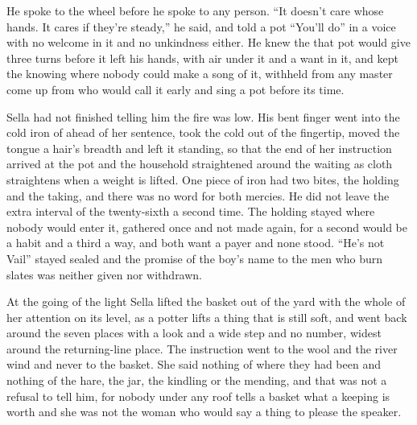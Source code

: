 He spoke to the wheel before he spoke to any person. “It doesn't care whose hands. It cares if they're steady,” he said, and told a pot “You'll do” in a voice with no welcome in it and no unkindness either. He knew the  that pot would give three turns before it left his hands, with air under it and a want in it, and kept the knowing where nobody could make a song of it, withheld from any master come up from  who would call it early and sing a pot before its time.

Sella had not finished telling him the fire was low. His bent finger went into the cold iron of  ahead of her sentence, took the cold out of the fingertip, moved the tongue a hair's breadth and left it standing, so that the end of her instruction arrived at the pot and the household straightened around the waiting as cloth straightens when a weight is lifted. One piece of iron had two bites, the holding and the taking, and there was no  word for both mercies. He did not leave the extra interval of the twenty-sixth a second time. The holding stayed where nobody would enter it, gathered once and not made again, for a second would be a habit and a third a way, and both want a payer and none stood. “He's not Vail” stayed sealed and the promise of the boy's name to the men who burn slates was neither given nor withdrawn.

\scenebreak

At the going of the light Sella lifted the basket out of the yard with the whole of her attention on its level, as a potter lifts a thing that is still soft, and went back around the seven places with a look and a wide step and no number, widest around the returning-line place. The instruction went to the wool and the river wind and never to the basket. She said nothing of where they had been and nothing of the hare, the jar, the kindling or the mending, and that was not a refusal to tell him, for nobody under any roof tells a basket what a keeping is worth and she was not the woman who would say a thing to please the speaker.

